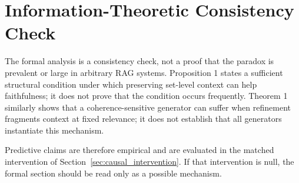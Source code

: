 
\section{Information-Theoretic Consistency Check}
\label{sec:fix08_theory_reframe}


The formal analysis is a consistency check, not a proof that the paradox is
prevalent or large in arbitrary RAG systems. Proposition 1 states a
sufficient structural condition under which preserving set-level context can
help faithfulness; it does not prove that the condition occurs frequently.
Theorem 1 similarly shows that a coherence-sensitive generator can suffer
when refinement fragments context at fixed relevance; it does not establish
that all generators instantiate this mechanism.

Predictive claims are therefore empirical and are evaluated in the matched
intervention of Section~\ref{sec:causal_intervention}. If that intervention
is null, the formal section should be read only as a possible mechanism.
